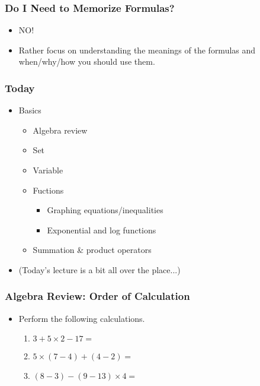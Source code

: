\documentclass[pdflatex, 12pt]{beamer}
\begin{document}
\begin{frame}
\frametitle{Do I Need to Memorize Formulas?}
\begin{itemize}
\item NO!
\vspace{0.4cm}
\item Rather focus on understanding the meanings of the formulas and when/why/how you should use them.
\end{itemize}
\end{frame}

\begin{frame}
\frametitle{Today}
\begin{itemize}
\item Basics
 \begin{itemize}
 \item Algebra review
 \item Set
 \item Variable
 \item Fuctions
  \begin{itemize}
  \item Graphing equations/inequalities
  \item Exponential and log functions
  \end{itemize}
 \item Summation \& product operators
 \end{itemize}
\vspace{0.4cm}
\item (Today's lecture is a bit all over the place...)
\end{itemize}
\end{frame}

\begin{frame}
\frametitle{Algebra Review: Order of Calculation}
\begin{itemize}
\item Perform the following calculations.
 \begin{enumerate}
 \item $3 + 5 \times 2 - 17 = $
 \item $5 \times (7 - 4) + (4 - 2) = $
 \item $(8 - 3) - (9 - 13) \times 4 = $
 \end{enumerate}
\end{itemize}
\end{frame}
\end{document}
